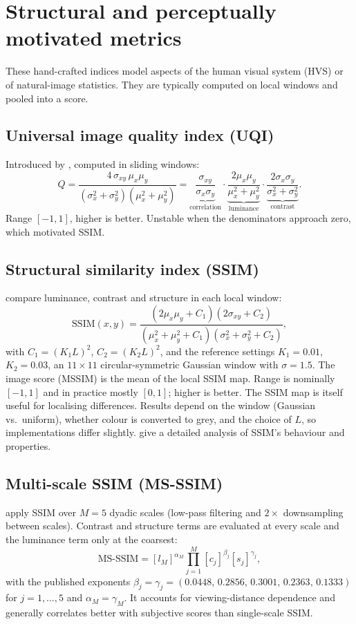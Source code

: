 \section{Structural and perceptually motivated metrics}

These hand-crafted indices model aspects of the human visual system (HVS) or of natural-image statistics. They are typically computed on local windows and pooled into a score.

\subsection{Universal image quality index (UQI)}
Introduced by \citet{wang2002uqi}, computed in sliding windows:
\[
Q = \frac{4\,\sigma_{xy}\,\mu_x\mu_y}{(\sigma_x^2+\sigma_y^2)(\mu_x^2+\mu_y^2)}
 = \underbrace{\frac{\sigma_{xy}}{\sigma_x\sigma_y}}_{\text{correlation}}\cdot
   \underbrace{\frac{2\mu_x\mu_y}{\mu_x^2+\mu_y^2}}_{\text{luminance}}\cdot
   \underbrace{\frac{2\sigma_x\sigma_y}{\sigma_x^2+\sigma_y^2}}_{\text{contrast}}.
\]
Range $[-1,1]$, higher is better. Unstable when the denominators approach zero, which motivated SSIM.

\subsection{Structural similarity index (SSIM)}
\citet{wang2004ssim} compare luminance, contrast and structure in each local window:
\[
\mathrm{SSIM}(x,y)=\frac{(2\mu_x\mu_y+C_1)(2\sigma_{xy}+C_2)}{(\mu_x^2+\mu_y^2+C_1)(\sigma_x^2+\sigma_y^2+C_2)},
\]
with $C_1=(K_1L)^2$, $C_2=(K_2L)^2$, and the reference settings $K_1=0.01$, $K_2=0.03$, an $11\times11$ circular-symmetric Gaussian window with $\sigma=1.5$. The image score (MSSIM) is the mean of the local SSIM map. Range is nominally $[-1,1]$ and in practice mostly $[0,1]$; higher is better. The SSIM map is itself useful for localising differences. Results depend on the window (Gaussian vs.\ uniform), whether colour is converted to grey, and the choice of $L$, so implementations differ slightly. \citet{nilsson2020understanding} give a detailed analysis of SSIM's behaviour and properties.

\subsection{Multi-scale SSIM (MS-SSIM)}
\citet{wang2003msssim} apply SSIM over $M=5$ dyadic scales (low-pass filtering and $2\times$ downsampling between scales). Contrast and structure terms are evaluated at every scale and the luminance term only at the coarsest:
\[
\text{MS-SSIM}=[l_M]^{\alpha_M}\prod_{j=1}^{M}[c_j]^{\beta_j}[s_j]^{\gamma_j},
\]
with the published exponents $\beta_j=\gamma_j=(0.0448,\,0.2856,\,0.3001,\,0.2363,\,0.1333)$ for $j=1,\dots,5$ and $\alpha_M=\gamma_M$. It accounts for viewing-distance dependence and generally correlates better with subjective scores than single-scale SSIM.

